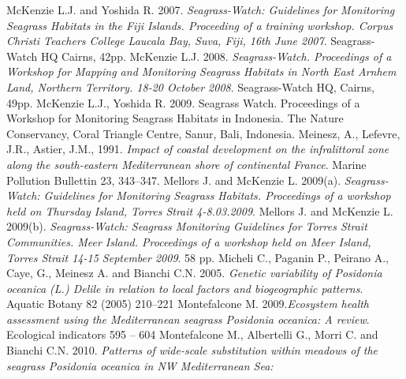 \documentclass[11pt]{article}
\begin{document}
\begin{thebibliography}{999}
McKenzie L.J. and Yoshida R. 2007. \emph{Seagrass-Watch: Guidelines for Monitoring
Seagrass Habitats in the Fiji Islands. Proceeding of a training workshop. Corpus Christi Teachers College Laucala Bay, Suva, Fiji, 16th June 2007}. Seagrass-Watch HQ Cairns, 42pp. \pageref{McKenzie07}
McKenzie L.J. 2008. \emph{Seagrass-Watch. Proceedings of a Workshop for Mapping and
Monitoring Seagrass Habitats in North East Arnhem Land, Northern Territory. 18-20 October 2008}. Seagrass-Watch HQ, Cairns, 49pp. \pageref{McKenzie08}
McKenzie L.J., Yoshida R. 2009. Seagrass Watch. Proceedings of a Workshop for
Monitoring Seagrass Habitats in Indonesia. The Nature Conservancy, Coral Triangle Centre, Sanur, Bali, Indonesia. \pageref{McKenzie09}
Meinesz, A., Lefevre, J.R., Astier, J.M., 1991. \emph{Impact of coastal development on the infralittoral zone along the south-eastern Mediterranean shore of continental France}. Marine Pollution Bullettin 23, 343–347. \pageref{Meinesz91}
Mellors J. and McKenzie L. 2009(a). \emph{Seagrass-Watch: Guidelines for Monitoring
Seagrass Habitats. Proceedings of a workshop held on Thursday Island, Torres Strait 4-8.03.2009}. \pageref{Mellors09a}
Mellors J. and McKenzie L. 2009(b). \emph{Seagrass-Watch: Seagrass Monitoring Guidelines
for Torres Strait Communities. Meer Island. Proceedings of a workshop held on Meer Island, Torres Strait 14-15 September 2009}. 58 pp. \pageref{Mellors09b}
Micheli C., Paganin P., Peirano A., Caye, G., Meinesz A. and Bianchi C.N. 2005. \emph{Genetic variability of \textit{{Posidonia oceanica}} (L.) Delile in relation to local factors and biogeographic patterns}. Aquatic Botany 82 (2005) 210–221 \pageref{Micheli05}
Montefalcone M. 2009.\emph{Ecosystem health assessment using the Mediterranean seagrass
\textit{Posidonia oceanica}: A review}. Ecological indicators 595 – 604 \pageref{Montefalcone09}
Montefalcone M., Albertelli G., Morri C. and Bianchi C.N. 2010. \emph{Patterns of wide-scale substitution within meadows of the seagrass \textit{{Posidonia oceanica}} in NW Mediterranean Sea:
}
\end{thebibliography}
\end{document}

